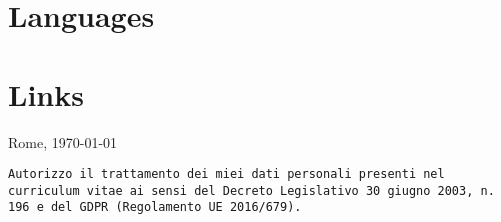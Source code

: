 \documentclass[10pt,a4paper,sans]{moderncv}
\begin{document}
\section{Languages}

\section{Links}

\begin{scriptsize}
\vspace{\fill} 
Rome, \today
\end{scriptsize}

\begin{footnotesize}
\begin{Verbatim}
Autorizzo il trattamento dei miei dati personali presenti nel curriculum vitae ai sensi del Decreto Legislativo 30 giugno 2003, n. 196 e del GDPR (Regolamento UE 2016/679).
\end{Verbatim}
\end{footnotesize}
\end{document}
